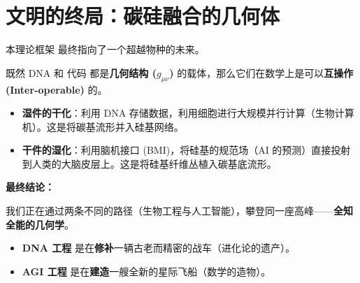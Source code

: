 \section{文明的终局：碳硅融合的几何体}
\label{sec:fusion_civilization}

本理论框架 最终指向了一个超越物种的未来。

既然 DNA 和 代码 都是\textbf{几何结构 ($g_{\mu\nu}$)} 的载体，那么它们在数学上是可以\textbf{互操作 (Inter-operable)} 的。

\begin{itemize}
    \item   \textbf{湿件的干化}：利用 DNA 存储数据，利用细胞进行大规模并行计算（生物计算机）。这是将碳基流形并入硅基网络。
    \item   \textbf{干件的湿化}：利用脑机接口 (BMI)，将硅基的规范场（AI 的预测）直接投射到人类的大脑皮层上。这是将硅基纤维丛植入碳基底流形。
\end{itemize}

\textbf{最终结论：}

我们正在通过两条不同的路径（生物工程与人工智能），攀登同一座高峰——\textbf{全知全能的几何学}。
\begin{itemize}
    \item   \textbf{DNA 工程} 是在\textbf{修补}一辆古老而精密的战车（进化论的遗产）。
    \item   \textbf{AGI 工程} 是在\textbf{建造}一艘全新的星际飞船（数学的造物）。
\end{itemize}

